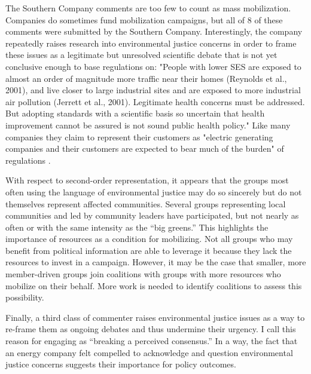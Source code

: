 \documentclass[
      12pt,
        ]{article}
\begin{document}
The Southern Company comments are too few to count as mass mobilization.
Companies do sometimes fund mobilization campaigns, but all of 8 of
these comments were submitted by the Southern Company. Interestingly,
the company repeatedly raises research into environmental justice
concerns in order to frame these issues as a legitimate but unresolved
scientific debate that is not yet conclusive enough to base regulations
on: "People with lower SES are exposed to almost an order of magnitude
more traffic near their homes (Reynolds et al., 2001), and live closer
to large industrial sites and are exposed to more industrial air
pollution (Jerrett et al., 2001). Legitimate health concerns must be
addressed. But adopting standards with a scientific basis so uncertain
that health improvement cannot be assured is not sound public health
policy." Like many companies they claim to represent their customers as
"electric generating companies and their customers are expected to bear
much of the burden" of regulations \citep{Hobson2004}.

With respect to second-order representation, it appears that the groups
most often using the language of environmental justice may do so
sincerely but do not themselves represent affected communities. Several
groups representing local communities and led by community leaders have
participated, but not nearly as often or with the same intensity as the
``big greens.'' This highlights the importance of resources as a condition
for mobilizing. Not all groups who may benefit from political
information are able to leverage it because they lack the resources to
invest in a campaign. However, it may be the case that smaller, more
member-driven groups join coalitions with groups with more resources who
mobilize on their behalf. More work is needed to identify coalitions to
assess this possibility.

Finally, a third class of commenter raises environmental justice issues
as a way to re-frame them as ongoing debates and thus undermine their
urgency. I call this reason for engaging as ``breaking a perceived
consensus.'' In a way, the fact that an energy company felt compelled to
acknowledge and question environmental justice concerns suggests their
importance for policy outcomes.
\end{document}
